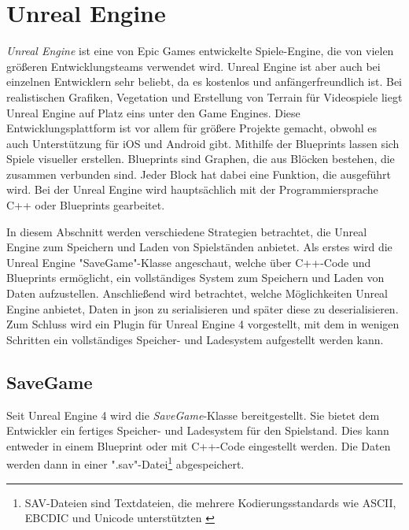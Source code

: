 \section{Unreal Engine}
\textit{Unreal Engine} ist eine von Epic Games entwickelte Spiele-Engine, die von vielen größeren Entwicklungsteams verwendet wird. Unreal Engine ist aber auch bei einzelnen Entwicklern sehr beliebt, da es kostenlos und anfängerfreundlich ist. Bei realistischen Grafiken, Vegetation und Erstellung von Terrain für Videospiele liegt Unreal Engine auf Platz eins unter den Game Engines.\cite{vsmid2017comparison} Diese Entwicklungsplattform ist vor allem für größere Projekte gemacht, obwohl es auch Unterstützung für iOS und Android gibt. Mithilfe der Blueprints lassen sich Spiele visueller erstellen. Blueprints sind Graphen, die aus Blöcken bestehen, die zusammen verbunden sind. Jeder Block hat dabei eine Funktion, die ausgeführt wird. Bei der Unreal Engine wird hauptsächlich mit der Programmiersprache C++ oder Blueprints gearbeitet.\cite{vsmid2017comparison}

In diesem Abschnitt werden verschiedene Strategien betrachtet, die Unreal Engine zum Speichern und Laden von Spielständen anbietet. Als erstes wird die Unreal Engine "SaveGame"-Klasse angeschaut, welche über C++-Code und Blueprints ermöglicht, ein vollständiges System zum Speichern und Laden von Daten aufzustellen. Anschließend wird betrachtet, welche Möglichkeiten Unreal Engine anbietet, Daten in \ac{json} zu serialisieren und später diese zu deserialisieren. Zum Schluss wird ein Plugin für Unreal Engine 4 vorgestellt, mit dem in wenigen Schritten ein vollständiges Speicher- und Ladesystem aufgestellt werden kann. 



\subsection{SaveGame}
Seit Unreal Engine 4 wird die \textit{SaveGame}-Klasse bereitgestellt. Sie bietet dem Entwickler ein fertiges Speicher- und Ladesystem für den Spielstand. Dies kann entweder in einem Blueprint oder mit C++-Code eingestellt werden. Die Daten werden dann in einer ".sav"-Datei\footnote{SAV-Dateien sind Textdateien, die mehrere Kodierungsstandards wie ASCII, EBCDIC und Unicode unterstützten \cite{filextSavDatei}} abgespeichert.\cite{unrealengineSavingLoading}

